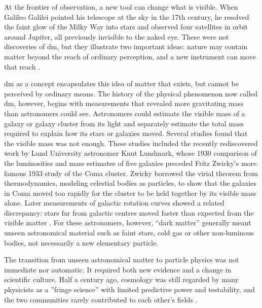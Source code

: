 At the frontier of observation, a new tool can change what is visible. When
Galileo Galilei pointed his telescope at the sky in the 17th century, he
resolved the faint glow of the Milky Way into stars and observed four
satellites in orbit around Jupiter, all previously invisible to the naked eye.
These were not discoveries of \gls{dm}, but they illustrate two important ideas:
nature may contain matter beyond the reach of ordinary perception, and a new
instrument can move that reach \cite{bertone2016-history-dark-matter}. 



\gls{dm} as a concept encapsulates this idea of matter that exists, but cannot
be perceived by ordinary means. The history of the physical phenomenon now
called \gls{dm}, however, begins with measurements that revealed more
gravitating mass than astronomers could see. Astronomers could estimate the
visible mass of a galaxy or galaxy cluster from its light and separately
estimate the total mass required to explain how its stars or galaxies moved.
Several studies found that the visible mass was not enough. 
These studies included the recently rediscovered work by Lund University astronomer Knut Lundmark, whose
1930 comparison of the luminosities and mass estimates of five galaxies
preceded Fritz Zwicky's more famous 1933 study of the Coma cluster. Zwicky borrowed
the virial theorem from thermodynamics, modeling celestial bodies as particles, to show that the galaxies in Coma moved too rapidly for the
cluster to be held together by its visible mass alone.
Later measurements of galactic rotation curves showed a related
discrepancy: stars far from galactic centres moved faster than expected from the
visible matter
\cite{lundmark1930-galaxy-masses,bertone2016-history-dark-matter,
orodruin2016-lundmark-darkmatter}. For these astronomers, however, ``dark
matter'' generally meant unseen astronomical material such as faint stars, cold
gas or other non-luminous bodies, not necessarily a new elementary particle.

The transition from unseen astronomical matter to particle physics was not
immediate nor automatic. It required both new evidence and a change in
scientific culture. Half a century ago, cosmology was still regarded by many physicists as a ''fringe science'' with limited predictive
power and testability, and the two communities rarely contributed to each
other's fields \cite{bertone2016-history-dark-matter}.

